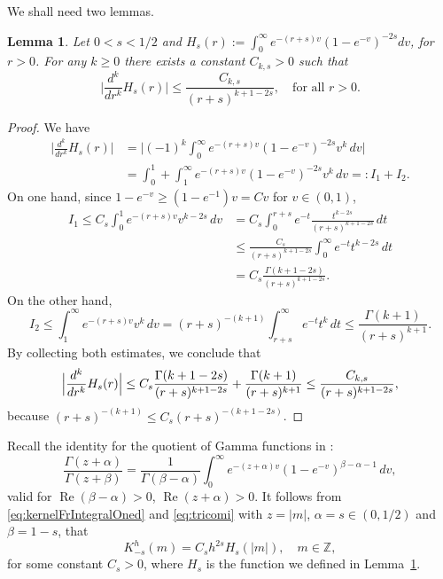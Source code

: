 \documentclass[a4paper,11pt,reqno]{amsart}
\newcommand{\Z}{\mathbb{Z}}
\renewcommand{\Re}{\operatorname{Re}}
\newtheorem{lem}[thm]{Lemma}
\theoremstyle{definition}
\numberwithin{equation}{section}
\begin{document}
We shall need two lemmas.

\begin{lem}
\label{derivative}
Let $0<s<1/2$ and  $\displaystyle H_s(r):=\int_0^\infty e^{-(r+s)v} (1-e^{-v})^{-2s} dv$, for $r >0$.
For any $k\geq0$ there exists a constant $C_{k,s} >0$ such that
$$
\Big|\frac{d^k}{dr^k}H_s(r)\Big|\le\frac{C_{k,s}}{(r+s)^{k+1-2s}},\quad\text{for all } r>0.
$$
\end{lem}

\begin{proof}
We have
\begin{align*}
\Big|\frac{d^k}{dr^k}H_s(r)\Big|&=\Big|(-1)^k\int_0^{\infty}e^{-(r+s)v}(1-e^{-v})^{-2s}v^k\,dv\Big|
\\&=\int_0^1+\int_1^{\infty} e^{-(r+s)v}(1-e^{-v})^{-2s}v^k\,dv=:I_1+I_2.
\end{align*}
On one hand, since $1-e^{-v}\ge(1-e^{-1})v=Cv$ for $v\in (0,1)$,
\begin{align*}
I_1\le C_s\int_0^1e^{-(r+s)v}v^{k-2s}\,dv&=C_s\int_0^{r+s}e^{-t}\frac{t^{k-2s}}{(r+s)^{k+1-2s}}\,dt\\
&\le \frac{C_s}{(r+s)^{k+1-2s}}\int_0^{\infty}e^{-t}t^{k-2s}\,dt\\
&=C_s\frac{\Gamma(k+1-2s)}{(r+s)^{k+1-2s}}.
\end{align*}
On the other hand,
$$
I_2\le \int_1^{\infty}e^{-(r+s)v}v^k\,dv = (r+s)^{-(k+1)}
\int_{r+s}^{\infty}e^{-t}t^k\,dt \le \frac{\Gamma(k+1)}{(r+s)^{k+1}}.
$$
By collecting both estimates, we conclude that
\begin{equation*}
\Big|\frac{d^k}{dr^k}H_s(r)\Big|
\le C_s\frac{\Gamma(k+1-2s)}{(r+s)^{k+1-2s}}+\frac{\Gamma(k+1)}{(r+s)^{k+1}}\\
\le \frac{C_{k,s}}{(r+s)^{k+1-2s}},
\end{equation*}
because $(r+s)^{-(k+1)}\le C_s (r+s)^{-(k+1-2s)}$.
\end{proof}
Recall the identity for the quotient of Gamma functions in \cite[Section 7 (15)]{Tricomi-Erdelyi}:
\begin{equation}
\label{eq:tricomi}
\frac{\Gamma(z+\alpha)}{\Gamma(z+\beta)}=\frac{1}{\Gamma(\beta-\alpha)}\int_0^{\infty}e^{-(z+\alpha)v}(1-e^{-v})^{\beta-\alpha-1}\,dv,
\end{equation}
valid for $\Re(\beta-\alpha)>0$, $\Re(z+\alpha)>0$.
It follows from \eqref{eq:kernelFrIntegralOned} and \eqref{eq:tricomi} with $z=|m|$,
$\alpha=s\in(0,1/2)$ and $\beta=1-s$, that
\begin{equation}
\label{conexion}
K^h_{-s}(m)=C_sh^{2s}H_s(|m|),\quad m\in\Z,
\end{equation}
for some constant $C_s>0$, where $H_s$ is the function we defined in Lemma~\ref{derivative}.
\end{document}
